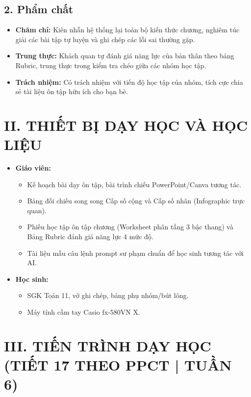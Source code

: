 \documentclass[12pt, a4paper]{article}
\begin{document}
\subsection*{2. Phẩm chất}

\begin{itemize}[leftmargin=1.2cm]
    \item \textbf{Chăm chỉ:} Kiên nhẫn hệ thống lại toàn bộ kiến thức chương, nghiêm túc giải các bài tập tự luyện và ghi chép các lỗi sai thường gặp.
    \item \textbf{Trung thực:} Khách quan tự đánh giá năng lực của bản thân theo bảng Rubric, trung thực trong kiểm tra chéo giữa các nhóm học tập.
    \item \textbf{Trách nhiệm:} Có trách nhiệm với tiến độ học tập của nhóm, tích cực chia sẻ tài liệu ôn tập hữu ích cho bạn bè.
\end{itemize}

\section*{II. THIẾT BỊ DẠY HỌC VÀ HỌC LIỆU}

\begin{itemize}[leftmargin=1.2cm]
    \item \textbf{Giáo viên:}
    \begin{itemize}[leftmargin=0.6cm]
        \item Kế hoạch bài dạy ôn tập, bài trình chiếu PowerPoint/Canva tương tác.
        \item Bảng đối chiếu song song Cấp số cộng và Cấp số nhân (Infographic trực quan).
        \item Phiếu học tập ôn tập chương (Worksheet phân tầng 3 bậc thang) và Bảng Rubric đánh giá năng lực 4 mức độ.
        \item Tài liệu mẫu câu lệnh prompt sư phạm chuẩn để học sinh tương tác với AI.
    \end{itemize}
    \item \textbf{Học sinh:}
    \begin{itemize}[leftmargin=0.6cm]
        \item SGK Toán 11, vở ghi chép, bảng phụ nhóm/bút lông.
        \item Máy tính cầm tay Casio fx-580VN X.
    \end{itemize}
\end{itemize}

\section*{III. TIẾN TRÌNH DẠY HỌC (TIẾT 17 THEO PPCT | TUẦN 6)}
\end{document}

